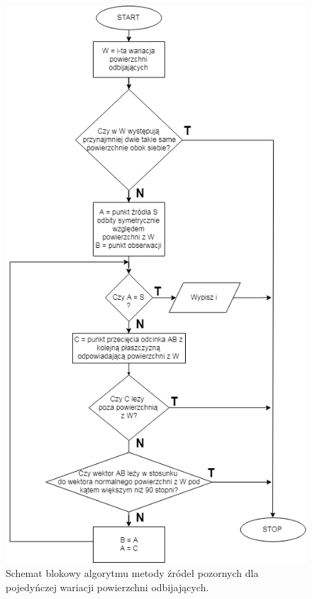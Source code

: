 \begin{figure}[h]
        \centering
                \centering
                \includegraphics[width=12cm]{kerneldiagram}
	\caption{Schemat blokowy algorytmu metody źródeł pozornych dla pojedyńczej wariacji powierzchni odbijających.}
\end{figure}

